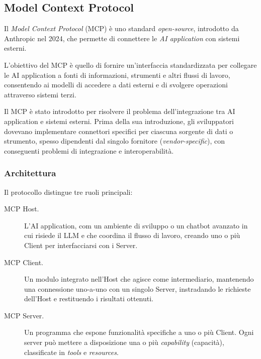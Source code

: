 


\subsection{Model Context Protocol} %

Il \textit{Model Context Protocol} (MCP) è uno standard \textit{open-source}, introdotto da Anthropic nel 2024, che permette di connettere le \textit{AI application} con sistemi esterni. \cite{mcp}

L'obiettivo del MCP è quello di fornire un'interfaccia standardizzata per collegare le AI application a fonti di informazioni, strumenti e altri flussi di lavoro, consentendo ai modelli di accedere a dati esterni e di svolgere operazioni attraverso sistemi terzi.

Il MCP è stato introdotto per risolvere il problema dell'integrazione tra AI application e sistemi esterni. Prima della sua introduzione, gli sviluppatori dovevano implementare connettori specifici per ciascuna sorgente di dati o strumento, spesso dipendenti dal singolo fornitore (\textit{vendor-specific}), con conseguenti problemi di integrazione  e interoperabilità.

\subsubsection{Architettura}

Il protocollo distingue tre ruoli principali:

\begin{description}
    \item[MCP Host.] L'AI application, com un ambiente di sviluppo o un chatbot avanzato in cui risiede il LLM e che coordina il flusso di lavoro, creando uno o più Client per interfacciarsi con i Server.

    \item[MCP Client.] Un modulo integrato nell'Host che agisce come intermediario, mantenendo una connessione uno-a-uno con un singolo Server, instradando le richieste dell'Host e restituendo i risultati ottenuti.

    \item[MCP Server.] Un programma che espone funzionalità specifiche a uno o più Client. Ogni server può mettere a disposizione una o più \textit{capability} (capacità), classificate in \textit{tools} e \textit{resources}.
\end{description}


